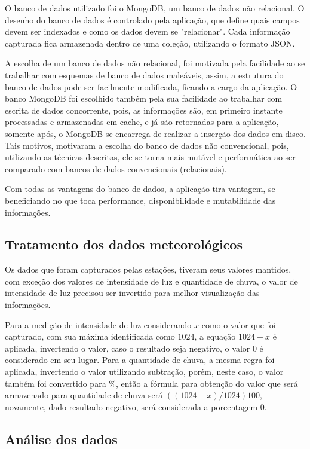 O banco de dados utilizado foi o MongoDB, um banco de dados não relacional. O desenho do banco de dados é controlado pela aplicação, que define quais campos devem ser indexados e como os dados devem se "relacionar". Cada informação capturada fica armazenada dentro de uma coleção, utilizando o formato JSON.

A escolha de um banco de dados não relacional, foi motivada pela facilidade ao se trabalhar com esquemas de banco de dados maleáveis, assim, a estrutura do banco de dados pode ser facilmente modificada, ficando a cargo da aplicação. O banco MongoDB foi escolhido também pela sua facilidade ao trabalhar com escrita de dados concorrente, pois, as informações são, em primeiro instante processadas e armazenadas em cache, e já são retornadas para a aplicação, somente após, o MongoDB se encarrega de realizar a inserção dos dados em disco. Tais motivos, motivaram a escolha do banco de dados não convencional, pois, utilizando as técnicas descritas, ele se torna mais mutável e performática ao ser comparado com bancos de dados convencionais (relacionais).

Com todas as vantagens do banco de dados, a aplicação tira vantagem, se beneficiando no que toca performance, disponibilidade e mutabilidade das informações.

\subsection{Tratamento dos dados meteorológicos}
\label{sec:tratamento_dados}

Os dados que foram capturados pelas estações, tiveram seus valores mantidos, com exceção dos valores de intensidade de luz e quantidade de chuva, o valor de intensidade de luz precisou ser invertido para melhor visualização das informações.

Para a medição de intensidade de luz considerando $x$ como o valor que foi capturado, com sua máxima identificada como $1024$, a equação $1024 - x$ é aplicada, invertendo o valor, caso o resultado seja negativo, o valor $0$ é considerado em seu lugar. Para a quantidade de chuva, a mesma regra foi aplicada, invertendo o valor utilizando subtração, porém, neste caso, o valor também foi convertido para \%, então a fórmula para obtenção do valor que será armazenado para quantidade de chuva será $((1024-x)/1024)100$, novamente, dado resultado negativo, será considerada a porcentagem $0$.

\subsection{Análise dos dados}

